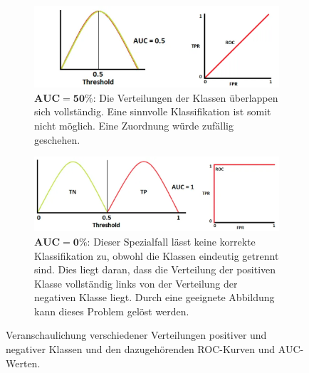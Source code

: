 \begin{figure}[h]
  \begin{subfigure}[b]{\thiswidth}
      \includegraphics[width=\linewidth]{bilder/auc_05.png}
      \caption{$\mathbf{AUC = \num{50}\%}$: Die Verteilungen der Klassen überlappen sich vollständig. Eine sinnvolle Klassifikation ist somit nicht möglich. Eine Zuordnung würde zufällig geschehen.}
      \label{fig:subfig3}
  \end{subfigure}
  \hfill
  \begin{subfigure}[b]{\thiswidth}
      \includegraphics[width=\linewidth]{bilder/auc_1.png}
      \caption{$\mathbf{AUC = \num{0}\%}$: Dieser Spezialfall lässt keine korrekte Klassifikation zu, obwohl die Klassen eindeutig getrennt sind. Dies liegt daran, dass die Verteilung der positiven Klasse vollständig links von der Verteilung der negativen Klasse liegt. Durch eine geeignete Abbildung kann dieses Problem gelöst werden.}
      \label{fig:subfig4}
  \end{subfigure}
  \caption{Veranschaulichung verschiedener Verteilungen positiver und negativer Klassen und den dazugehörenden ROC-Kurven und AUC-Werten.}
  \label{fig:main}
\end{figure}
